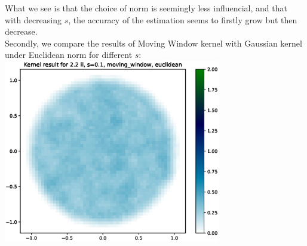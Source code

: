 \documentclass{article}
\begin{document}
What we see is that the choice of norm is seemingly less influencial, and that with decreasing $s$, the accuracy of the estimation seems to firstly grow but then decrease. \\
\noindent Secondly, we compare the results of Moving Window kernel with Gaussian kernel under Euclidean norm for different $s$: \\

\hspace*{-1.5cm}\includegraphics[height=8cm]{comparisons//Kernel_result_2-2ii_s_0-1_moving_window_euclidean.eps} \hspace*{-1.5cm}
\end{document}

